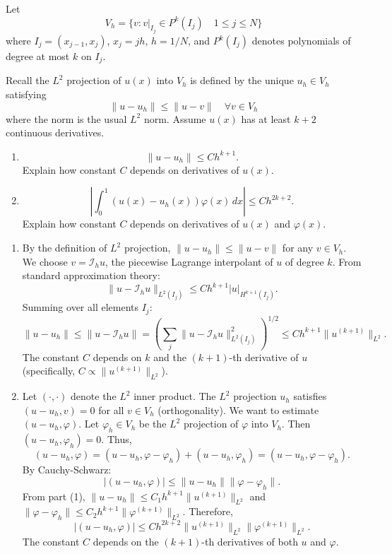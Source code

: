 \begin{exercise}
\label{applied:2013:4}
Let
\[
V_{h}=\{v:v|_{I_{j}}\in P^{k}(I_{j})\quad 1\leq j\leq N\}
\]
where $I_{j}=(x_{j-1},x_{j})$, $x_{j}=jh$, $h=1/N$, and $P^{k}(I_{j})$ denotes polynomials of degree at most $k$ on $I_{j}$.

Recall the $L^{2}$ projection of $u(x)$ into $V_{h}$ is defined by the unique $u_{h}\in V_{h}$ satisfying
\[
\|u-u_{h}\|\leq\|u-v\|\quad\forall v\in V_{h}
\]
where the norm is the usual $L^{2}$ norm. Assume $u(x)$ has at least $k+2$ continuous derivatives.

\begin{enumerate}
\item[(1)] %
\[
\|u-u_{h}\|\leq Ch^{k+1}.
\]
Explain how constant $C$ depends on derivatives of $u(x)$.
\item[(2)] %
\[
\left|\int_{0}^{1}(u(x)-u_{h}(x))\varphi(x)\,dx\right|\leq Ch^{2k+2}.
\]
Explain how constant $C$ depends on derivatives of $u(x)$ and $\varphi(x)$.
\end{enumerate}
\end{exercise}

\begin{solution}
\begin{enumerate}
    \item[(1)] By the definition of $L^2$ projection, $\|u - u_h\| \le \|u - v\|$ for any $v \in V_h$. We choose $v = \mathcal{I}_h u$, the piecewise Lagrange interpolant of $u$ of degree $k$. From standard approximation theory:
    \[
    \|u - \mathcal{I}_h u\|_{L^2(I_j)} \le C h^{k+1} |u|_{H^{k+1}(I_j)}.
    \]
    Summing over all elements $I_j$:
    \[
    \|u - u_h\| \le \|u - \mathcal{I}_h u\| = \left( \sum_j \|u - \mathcal{I}_h u\|_{L^2(I_j)}^2 \right)^{1/2} \le C h^{k+1} \|u^{(k+1)}\|_{L^2}.
    \]
    The constant $C$ depends on $k$ and the $(k+1)$-th derivative of $u$ (specifically, $C \propto \|u^{(k+1)}\|_{L^2}$).
    
    \item[(2)] Let $(\cdot, \cdot)$ denote the $L^2$ inner product. The $L^2$ projection $u_h$ satisfies $(u - u_h, v) = 0$ for all $v \in V_h$ (orthogonality).
    We want to estimate $(u - u_h, \varphi)$.
    Let $\varphi_h \in V_h$ be the $L^2$ projection of $\varphi$ into $V_h$. Then $(u - u_h, \varphi_h) = 0$.
    Thus,
    \[
    (u - u_h, \varphi) = (u - u_h, \varphi - \varphi_h) + (u - u_h, \varphi_h) = (u - u_h, \varphi - \varphi_h).
    \]
    By Cauchy-Schwarz:
    \[
    |(u - u_h, \varphi)| \le \|u - u_h\| \|\varphi - \varphi_h\|.
    \]
    From part (1), $\|u - u_h\| \le C_1 h^{k+1} \|u^{(k+1)}\|_{L^2}$ and $\|\varphi - \varphi_h\| \le C_2 h^{k+1} \|\varphi^{(k+1)}\|_{L^2}$.
    Therefore,
    \[
    |(u - u_h, \varphi)| \le C h^{2k+2} \|u^{(k+1)}\|_{L^2} \|\varphi^{(k+1)}\|_{L^2}.
    \]
    The constant $C$ depends on the $(k+1)$-th derivatives of both $u$ and $\varphi$.
\end{enumerate}
\end{solution}

